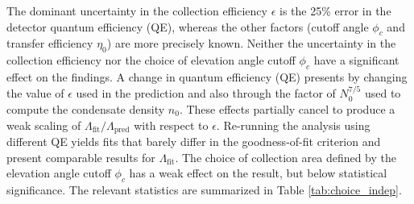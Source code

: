 	{The dominant uncertainty in the collection efficiency $\epsilon$ is the 25\% error in the detector quantum efficiency (QE), whereas the other factors (cutoff angle $\phi_c$ and transfer efficiency $\eta_0$) are more precisely known.
	Neither the uncertainty in the collection efficiency nor the choice of elevation angle cutoff $\phi_c$ have a significant effect on the findings. A change in quantum efficiency (QE) presents by changing the value of $\epsilon$ used in the prediction and also through the factor of $N_{0}^{7/5}$ used to compute the condensate density $n_0$. These effects partially cancel to produce a weak scaling of $\Lambda_\textrm{fit}/\Lambda_\textrm{pred}$ with respect to $\epsilon$.  Re-running the analysis using different QE yields fits that barely differ in the goodness-of-fit criterion and present comparable results for $\Lambda_\textrm{fit}$. The choice of collection area defined by the elevation angle cutoff $\phi_c$ has a weak effect on the result, but below statistical significance. 
	The relevant statistics are summarized in Table \ref{tab:choice_indep}.}

